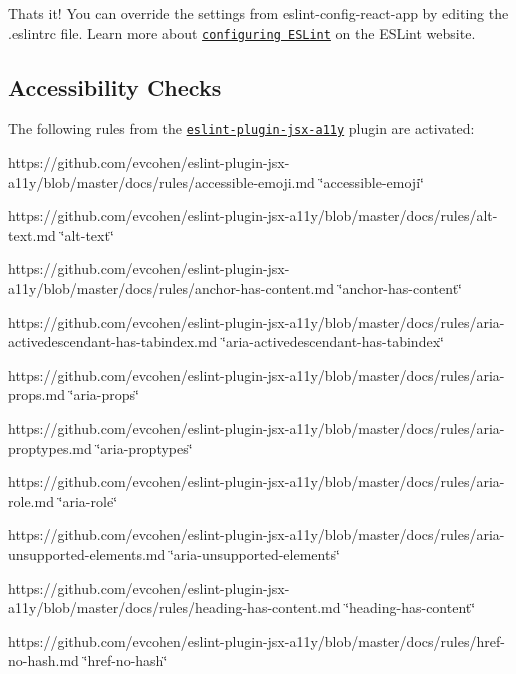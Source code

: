 That\textquotesingle{}s it! You can override the settings from {\ttfamily eslint-\/config-\/react-\/app} by editing the {\ttfamily .eslintrc} file. Learn more about \href{http://eslint.org/docs/user-guide/configuring}{\tt configuring E\+S\+Lint} on the E\+S\+Lint website.

\subsection*{Accessibility Checks}

The following rules from the \href{https://github.com/evcohen/eslint-plugin-jsx-a11y}{\tt eslint-\/plugin-\/jsx-\/a11y} plugin are activated\+:


\begin{DoxyItemize}
\item https\+://github.com/evcohen/eslint-\/plugin-\/jsx-\/a11y/blob/master/docs/rules/accessible-\/emoji.\+md \char`\"{}accessible-\/emoji\char`\"{}
\item https\+://github.com/evcohen/eslint-\/plugin-\/jsx-\/a11y/blob/master/docs/rules/alt-\/text.\+md \char`\"{}alt-\/text\char`\"{}
\item https\+://github.com/evcohen/eslint-\/plugin-\/jsx-\/a11y/blob/master/docs/rules/anchor-\/has-\/content.\+md \char`\"{}anchor-\/has-\/content\char`\"{}
\item https\+://github.com/evcohen/eslint-\/plugin-\/jsx-\/a11y/blob/master/docs/rules/aria-\/activedescendant-\/has-\/tabindex.\+md \char`\"{}aria-\/activedescendant-\/has-\/tabindex\char`\"{}
\item https\+://github.com/evcohen/eslint-\/plugin-\/jsx-\/a11y/blob/master/docs/rules/aria-\/props.\+md \char`\"{}aria-\/props\char`\"{}
\item https\+://github.com/evcohen/eslint-\/plugin-\/jsx-\/a11y/blob/master/docs/rules/aria-\/proptypes.\+md \char`\"{}aria-\/proptypes\char`\"{}
\item https\+://github.com/evcohen/eslint-\/plugin-\/jsx-\/a11y/blob/master/docs/rules/aria-\/role.\+md \char`\"{}aria-\/role\char`\"{}
\item https\+://github.com/evcohen/eslint-\/plugin-\/jsx-\/a11y/blob/master/docs/rules/aria-\/unsupported-\/elements.\+md \char`\"{}aria-\/unsupported-\/elements\char`\"{}
\item https\+://github.com/evcohen/eslint-\/plugin-\/jsx-\/a11y/blob/master/docs/rules/heading-\/has-\/content.\+md \char`\"{}heading-\/has-\/content\char`\"{}
\item https\+://github.com/evcohen/eslint-\/plugin-\/jsx-\/a11y/blob/master/docs/rules/href-\/no-\/hash.\+md \char`\"{}href-\/no-\/hash\char`\"{}

\end{DoxyItemize}

